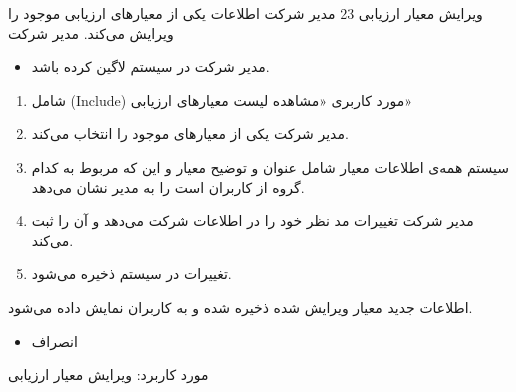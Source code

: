 {
\usecase
{
ویرایش معیار ارزیابی
}
{23}
{
مدیر شرکت اطلاعات یکی از معیارهای ارزیابی موجود را ویرایش می‌کند.
}
{
	مدیر شرکت
}
{}
{
	\begin{itemize}
	\vspace*{-0.6cm}
	\item 
	مدیر شرکت در سیستم لاگین کرده باشد.
\end{itemize}
}
{
	\vspace*{-0.6cm}
	\begin{enumerate}
		\item 
		شامل (Include) مورد کاربری «مشاهده لیست معیارهای ارزیابی»
		\item
		مدیر شرکت یکی از معیارهای موجود را انتخاب می‌کند.
		\item 
		سیستم همه‌ی اطلاعات معیار شامل عنوان و توضیح معیار و این که مربوط به کدام گروه از کاربران است را به مدیر نشان می‌دهد.
		\item 
		مدیر شرکت تغییرات مد نظر خود را در اطلاعات شرکت می‌دهد و آن را ثبت می‌کند.
		\item 
		تغییرات در سیستم ذخیره می‌شود.
	\end{enumerate}
}
{
اطلاعات جدید معیار ویرایش شده ذخیره شده و به کاربران نمایش داده می‌شود.
}
{
	\begin{itemize}
		\vspace*{-0.6cm}
		\item 
		انصراف
	\end{itemize}
}
{
	مورد کاربرد: ویرایش معیار ارزیابی
}



}



